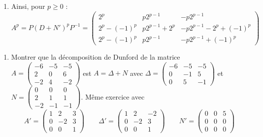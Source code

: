 \documentclass[12pt, class=report,crop=false]{standalone}
\begin{document}
\begin{exemple}
\begin{enumerate}
  \item Ainsi, pour $p\ge0$ :
  $$A^p = P (D+N')^p P^{-1}
  = \begin{pmatrix}
  2^{p} & p2^{p - 1}  & -p2^{p - 1}  \\
2^{p} - (-1)^{p} & p2^{p - 1}  + 2^{p} & -p2^{p - 1} 
- 2^{p} + (-1)^{p} \\
2^{p} - (-1)^{p} & p2^{p - 1}  & -p2^{p - 1} +
(-1)^{p}\end{pmatrix}$$
\end{enumerate}
\end{exemple}


\begin{miniexercices}
\sauteligne
\begin{enumerate}
\item Montrer que la décomposition de Dunford de la matrice
$A = \left(\begin{smallmatrix}
-6 & -5 & -5 \\
2 & 0 & 6 \\
-2 & 4 & -2
  \end{smallmatrix}\right)$
  est $A = \Delta + N$ avec
  $\Delta = \left(\begin{smallmatrix}
-6 & -5 & -5 \\
0 & -1 & 5 \\
0 & 5 & -1
  \end{smallmatrix}\right)$
  et $N = \left(\begin{smallmatrix}
0 & 0 & 0 \\
2 & 1 & 1 \\
-2 & -1 & -1
  \end{smallmatrix}\right)$.
  Même exercice avec
$$A' = \left(\begin{smallmatrix}
1 & 2 & 3 \\
0 & -2 & 3 \\
0 & 0 & 1
  \end{smallmatrix}\right)\qquad
\Delta' =  \left(\begin{smallmatrix}
1 & 2 & -2 \\
0 & -2 & 3 \\
0 & 0 & 1
  \end{smallmatrix}\right) \qquad
N' = \left(\begin{smallmatrix}
0 & 0 & 5 \\
0 & 0 & 0 \\
0 & 0 & 0
  \end{smallmatrix}\right)  
  $$
  

\end{enumerate}
\end{miniexercices}
\end{document}

